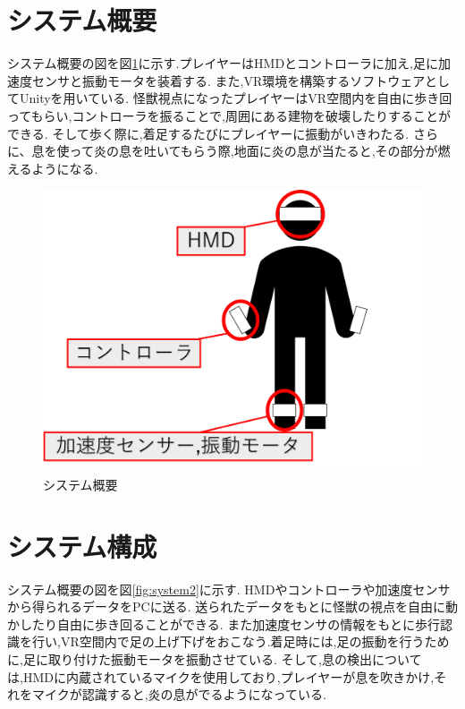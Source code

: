 \documentclass[uplatex]{jsarticle}   %
\begin{document}
\section{システム概要}
システム概要の図を図\ref{fig:system1}に示す.プレイヤーはHMDとコントローラに加え,足に加速度センサと振動モータを装着する.
また,VR環境を構築するソフトウェアとしてUnityを用いている.
怪獣視点になったプレイヤーはVR空間内を自由に歩き回ってもらい,コントローラを振ることで,周囲にある建物を破壊したりすることができる.
そして歩く際に,着足するたびにプレイヤーに振動がいきわたる.
さらに、息を使って炎の息を吐いてもらう際,地面に炎の息が当たると,その部分が燃えるようになる.

\begin{figure}
 \begin{center}
    \includegraphics[width=0.75\linewidth]{fig/system1.png}
 \end{center}
    \caption{システム概要}
    \label{fig:system1}
\end{figure}

\section{システム構成}
システム概要の図を図\ref{fig:system2}に示す.
HMDやコントローラや加速度センサから得られるデータをPCに送る.
送られたデータをもとに怪獣の視点を自由に動かしたり自由に歩き回ることができる.
また加速度センサの情報をもとに歩行認識を行い,VR空間内で足の上げ下げをおこなう.着足時には,足の振動を行うために,足に取り付けた振動モータを振動させている.
そして,息の検出については,HMDに内蔵されているマイクを使用しており,プレイヤーが息を吹きかけ,それをマイクが認識すると,炎の息がでるようになっている.
\end{document}
